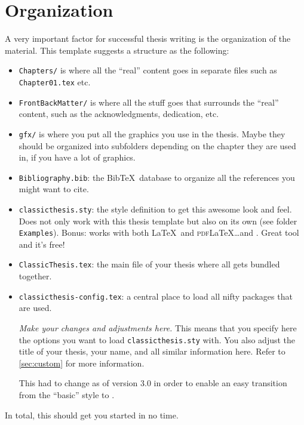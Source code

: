 \section{Organization}
A very important factor for successful thesis writing is the
organization of the material. This template suggests a structure as
the following:
\begin{itemize}
    \item\texttt{Chapters/} is where all the ``real'' content goes in
    separate files such as \texttt{Chapter01.tex} etc.
    \item\texttt{FrontBackMatter/} is where all the stuff goes that
    surrounds the ``real'' content, such as the acknowledgments,
    dedication, etc.
    \item\texttt{gfx/} is where you put all the graphics you use in
    the thesis. Maybe they should be organized into subfolders
    depending on the chapter they are used in, if you have a lot of
    graphics.
    \item\texttt{Bibliography.bib}: the Bib\TeX\ database to organize
    all the references you might want to cite.
    \item\texttt{classicthesis.sty}: the style definition to get this
    awesome look and feel. Does not only work with this thesis template
    but also on its own (see folder \texttt{Examples}). Bonus: works
    with both \LaTeX\ and \textsc{pdf}\LaTeX\dots and \mLyX.
    Great tool and it's free!
    \item\texttt{ClassicThesis.tex}: the main file of your thesis
    where all gets bundled together.
    \item\texttt{classicthesis-config.tex}: a central place to load all
    nifty packages that are used. %

    \emph{Make your changes and adjustments here.} This means that you
    specify here the options you want to load \texttt{classicthesis.sty}
    with. You also adjust the title of your thesis, your name, and all
    similar information here. Refer to \autoref{sec:custom} for more
    information.

    This had to change as of version 3.0 in order to enable an easy
    transition from the ``basic'' style to \mLyX.
\end{itemize}
In total, this should get you started in no time.


